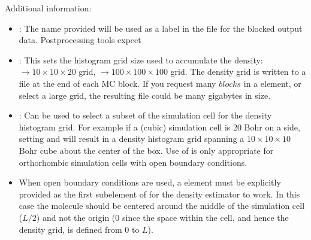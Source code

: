 \documentclass[letterpaper,10pt,english]{sphinxmanual}
\begin{document}
Additional information:
\begin{itemize}
\item {} 
: The name provided will be used as a label in the
 file for the blocked output data. Postprocessing tools
expect 

\item {} 
: This sets the histogram grid size used to accumulate the
density:
\(\rightarrow 10\times 10\times 20\)
grid,
\(\rightarrow 100\times 100\times 100\)
grid. The density grid is written to a  file at the end of
each MC block. If you request many \(blocks\) in a 
element, or select a large grid, the resulting  file could
be many gigabytes in size.

\item {} 
: Can be used to select a subset of the simulation
cell for the density histogram grid. For example if a (cubic)
simulation cell is 20 Bohr on a side, setting  and
 will result in a density histogram grid spanning a
\(10\times 10\times 10\) Bohr cube about the center of the box.
Use of  is only
appropriate for orthorhombic simulation cells with open boundary
conditions.

\item {} 
When open boundary conditions are used, a 
element must be explicitly provided as the first subelement of
 for the density estimator to work. In this case the
molecule should be centered around the middle of the simulation cell
(\(L/2\)) and not the origin (\(0\) since the space within
the cell, and hence the density grid, is defined from \(0\) to
\(L\)).

\end{itemize}
\def\sphinxLiteralBlockLabel{\label{\detokenize{hamiltonianobservable:listing-24}}}
\begin{sphinxVerbatim}[commandchars=\\\{\}]
      
\end{sphinxVerbatim}
\end{document}
